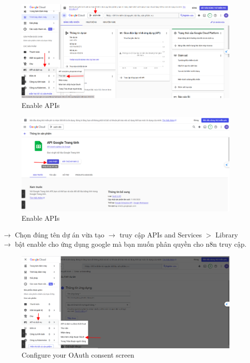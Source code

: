     \begin{figure}[H]
    \centering
    \includegraphics[width=1\textwidth]{images/3thuchi07.png}
    \caption{Enable APIs}
    \end{figure}

    \begin{figure}[H]
    \centering
    \includegraphics[width=1\textwidth]{images/3thuchi08.png}
    \caption{Enable APIs}
    \end{figure}
$\longrightarrow$ Chọn đúng tên dự án vừa tạo $\longrightarrow$ truy cập APIs and Services $>$ Library $\longrightarrow$ bật enable cho ứng dụng google mà bạn muốn phân quyền cho n8n truy cập.
    
    \begin{figure}[H]
    \centering
    \includegraphics[width=1\textwidth]{images/3thuchi09.png}
    \caption{Configure your OAuth consent screen}
    \end{figure}

